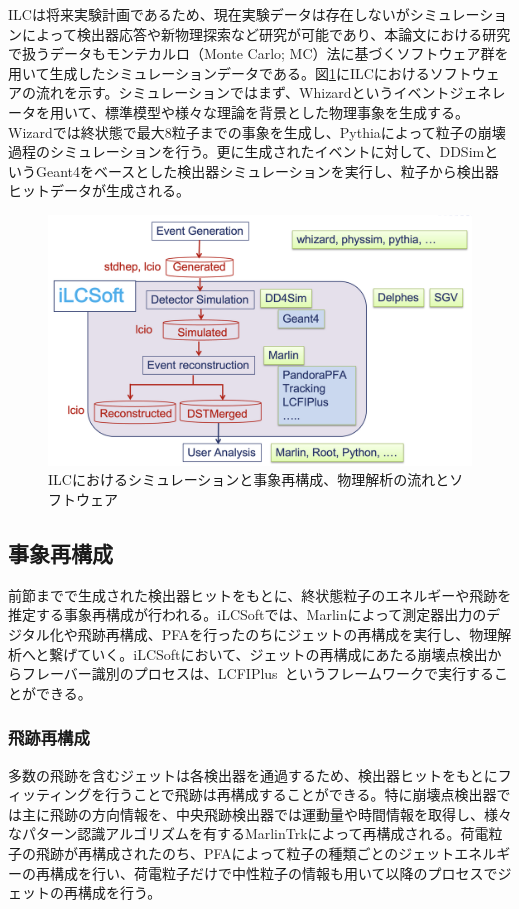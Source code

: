 ILCは将来実験計画であるため、現在実験データは存在しないがシミュレーションによって検出器応答や新物理探索など研究が可能であり、本論文における研究で扱うデータもモンテカルロ（Monte Carlo; MC）法に基づくソフトウェア群を用いて生成したシミュレーションデータである。図\ref{ilcsoft}にILCにおけるソフトウェアの流れを示す。シミュレーションではまず、Whizardというイベントジェネレータを用いて、標準模型や様々な理論を背景とした物理事象を生成する。Wizardでは終状態で最大8粒子までの事象を生成し、Pythiaによって粒子の崩壊過程のシミュレーションを行う。更に生成されたイベントに対して、DDSimというGeant4をベースとした検出器シミュレーションを実行し、粒子から検出器ヒットデータが生成される。
\begin{figure}[h]
	\begin{center}
 \includegraphics[keepaspectratio, scale=0.25]
 	{Figure/Introduction/ilcsoft.png}
 		\caption {ILCにおけるシミュレーションと事象再構成、物理解析の流れとソフトウェア}
 		\label{ilcsoft}
	\end{center}
\end{figure}

\subsection{事象再構成}
前節までで生成された検出器ヒットをもとに、終状態粒子のエネルギーや飛跡を推定する事象再構成が行われる。iLCSoftでは、Marlinによって測定器出力のデジタル化や飛跡再構成、PFAを行ったのちにジェットの再構成を実行し、物理解析へと繋げていく。iLCSoftにおいて、ジェットの再構成にあたる崩壊点検出からフレーバー識別のプロセスは、LCFIPlus~\cite{lcfiplus}というフレームワークで実行することができる。

\subsubsection{飛跡再構成}
多数の飛跡を含むジェットは各検出器を通過するため、検出器ヒットをもとにフィッティングを行うことで飛跡は再構成することができる。特に崩壊点検出器では主に飛跡の方向情報を、中央飛跡検出器では運動量や時間情報を取得し、様々なパターン認識アルゴリズムを有するMarlinTrkによって再構成される。荷電粒子の飛跡が再構成されたのち、PFAによって粒子の種類ごとのジェットエネルギーの再構成を行い、荷電粒子だけで中性粒子の情報も用いて以降のプロセスでジェットの再構成を行う。


